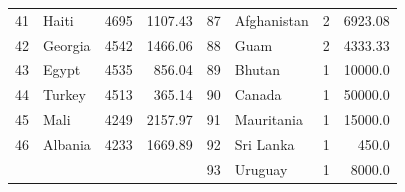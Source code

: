 \begin{longtable}{|c|l|r|r|c|l|r|r|}
	41          & Haiti                 & 4695                               & 1107.43                         & 87          & Afghanistan           & 2                                  & 6923.08                         \\
	42          & Georgia               & 4542                               & 1466.06                         & 88          & Guam                  & 2                                  & 4333.33                         \\
	43          & Egypt                 & 4535                               & 856.04                          & 89          & Bhutan                & 1                                  & 10000.0                         \\
	44          & Turkey                & 4513                               & 365.14                          & 90          & Canada                & 1                                  & 50000.0                         \\
	45          & Mali                  & 4249                               & 2157.97                         & 91          & Mauritania            & 1                                  & 15000.0                         \\
	46          & Albania               & 4233                               & 1669.89                         & 92          & Sri Lanka             & 1                                  & 450.0                           \\
	            &                       &                                    &                                 & 93          & Uruguay               & 1                                  & 8000.0                          \\
\end{longtable}

